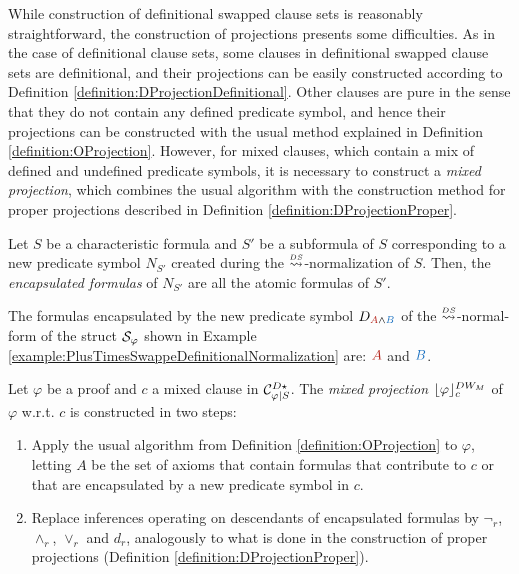 \noindent 
While construction of definitional swapped clause sets is reasonably
straightforward, the construction of projections presents some difficulties.
As in the case of definitional clause sets, some clauses in definitional
swapped clause sets are definitional, and their projections can be easily
constructed according to Definition \ref{definition:DProjectionDefinitional}.
Other clauses are pure in the sense that they do not contain any defined
predicate symbol, and hence their projections can be constructed with the
usual method explained in Definition \ref{definition:OProjection}. However,
for mixed clauses, which contain a mix of defined and undefined predicate
symbols, it is necessary to construct a \emph{mixed projection}, which
combines the usual algorithm with the construction method for proper 
projections described in Definition \ref{definition:DProjectionProper}.



\begin{definition}
\label{definition:EncapsulatedFormulaOccurrences} Let $S$ be a characteristic
formula and $S'$ be a subformula of $S$ corresponding to a new predicate
symbol $N_{S'}$ created during the $\normalizePlusTimesSD$-normalization of
$S$. Then, the \emph{encapsulated formulas} of $N_{S'}$ are all the atomic
formulas of $S'$. 
\end{definition}

\begin{example} 
\label{example:EncapsulatedFormulaOccurrences} 
The formulas encapsulated by the new predicate symbol 
$D_{\hA{A} \structplus \hB{B}}$ of the $\normalizePlusTimesSD$-normal-form 
of the struct $\mathcal{S}_{\varphi}$ shown
in Example \ref{example:PlusTimesSwappeDefinitionalNormalization} are:
$\hA{A}$ and $\hB{B}$. \hfill\QED 
\end{example}


\begin{definition}
\label{definition:DWProjectionMixed}
Let $\varphi$ be a proof and $c$ a mixed clause in $\mathcal{C}^{D\star}_{\varphi|S}$.
The \emph{mixed projection} $\lfloor \varphi \rfloor_{c}^{DW_M}$ of $\varphi$ w.r.t. $c$ is constructed in two steps:
\begin{enumerate}
\item Apply the usual algorithm from Definition \ref{definition:OProjection} to $\varphi$, letting $A$ be the set of axioms that contain formulas that contribute to $c$ or that are encapsulated by a new predicate symbol in $c$.
%
\item Replace inferences operating on descendants of encapsulated formulas by $\neg_r$, $\wedge_r$, $\vee_r$ and $d_r$, analogously to what is done in the construction of proper projections (Definition \ref{definition:DProjectionProper}).
\end{enumerate}
\end{definition}


